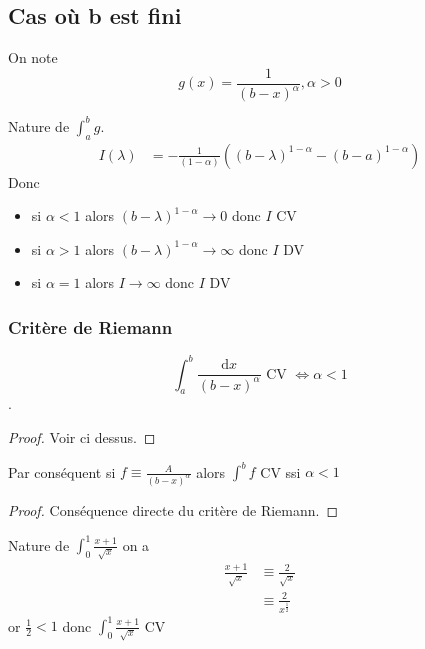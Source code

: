 \documentclass[11pt,colorlinks]{book}
\theoremstyle{mytheoremstyle}
\theoremstyle{mytheoremstyle}
\theoremstyle{mytheoremstyle}
\theoremstyle{mytheoremstyle}
\theoremstyle{mytheoremstyle}
\theoremstyle{mytheoremstyle}
\theoremstyle{mytheoremstyle}
\theoremstyle{mytheoremstyle}
\theoremstyle{myproblemstyle}
\begin{document}
  \subsection{Cas où b est fini}
  On note 
  \begin{equation*}
    g(x) = \frac{1}{(b-x)^{\alpha}}, \alpha > 0
  \end{equation*}
  \begin{prop}
    Nature de $\int_a^b g$. 
    \begin{align*}
      I(\lambda) &= - \frac{1}{(1-\alpha)} \left((b-\lambda)^{1-\alpha} - (b-a)^{1 - \alpha}\right)
    \end{align*}
    Donc
    \begin{itemize}
      \item si $\alpha < 1$ alors $(b - \lambda)^{1-\alpha} \to 0$ donc $I$ CV
      \item si $\alpha > 1$ alors $(b - \lambda)^{1-\alpha} \to \infty$ donc $I$ DV
      \item si $\alpha = 1$ alors $I \to \infty$ donc $I$ DV
    \end{itemize}
  \end{prop}
  \subsubsection{Critère de Riemann}
  \begin{theorem}
    \begin{equation*}
      \int_a^b \frac{\text{d}x}{(b-x)^{\alpha}} \text{ CV } \Leftrightarrow \alpha < 1
    \end{equation*}.
    \begin{proof}
      Voir ci dessus.
    \end{proof}
  \end{theorem}
  \begin{prop}
    Par conséquent si $f \equiv \frac{A}{(b-x)^{\alpha}}$ alors $\int^b f$ CV ssi $\alpha < 1$
    \begin{proof}
      Conséquence directe du critère de Riemann.
    \end{proof}
  \end{prop}
  \begin{ex}
    Nature de $\int_0^1 \frac{x+1}{\sqrt{x}}$ on a 
    \begin{align*}
      \frac{x+1}{\sqrt{x}} &\equiv \frac{2}{\sqrt{x}} \\
                          &\equiv \frac{2}{x^{\frac{1}{2}}}
    \end{align*}
    or $\frac{1}{2} < 1$ donc $\int_0^1 \frac{x+1}{\sqrt{x}}$ CV
  \end{ex}
\end{document}
